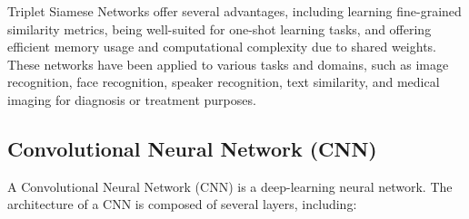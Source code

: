 Triplet Siamese Networks offer several advantages, including learning fine-grained similarity metrics, being well-suited for one-shot learning tasks, and offering efficient memory usage and computational complexity due to shared weights. These networks have been applied to various tasks and domains, such as image recognition, face recognition, speaker recognition, text similarity, and medical imaging for diagnosis or treatment purposes.


\subsection{Convolutional Neural Network (CNN)}

A Convolutional Neural Network (CNN) is a deep-learning neural network. The architecture of a CNN is composed of several layers, including:

